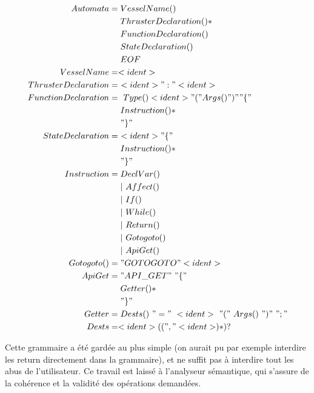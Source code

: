\documentclass[a4paper,11pt]{article}
\begin{document}
        \begin{align}
            Automata &= VesselName()\nonumber\\
                &~~~~ThrusterDeclaration()*\nonumber\\
                &~~~~FunctionDeclaration()~\nonumber\\
                &~~~~StateDeclaration()~\nonumber\\
                &~~~~EOF\nonumber\\
            VesselName &= <ident>\nonumber\\
            ThrusterDeclaration &=  ~<ident> ":" <ident>\nonumber\\
            FunctionDeclaration &=  ~Type() <ident> "(" Args() ")" "\{"\nonumber\\
                &~~~~ Instruction()* \nonumber\\ 
                &~~~~ "\}" \nonumber\\ 
            StateDeclaration &=  ~<ident> "\{"\nonumber\\
                &~~~~ Instruction()* \nonumber\\
                &~~~~ "\}" \nonumber\\
            Instruction &= DeclVar()\nonumber\\
                &~~~~|~Affect()\nonumber\\
                &~~~~|~If() \nonumber\\
                &~~~~|~While() \nonumber\\
                &~~~~|~Return()\nonumber\\
                &~~~~|~Gotogoto() \nonumber\\
                &~~~~|~ApiGet() \nonumber\\
            Gotogoto() &= "GOTOGOTO" <ident>\nonumber\\
            ApiGet&= "API\_GET"~"\{" \nonumber\\
                &~~~~ Getter()*\nonumber\\
                &~~~~ "\}"\nonumber\\
           Getter &=  Dests()~"="~<ident>~"("~Args()~")"~";"\nonumber\\
            Dests &=  <ident> (( "," <ident>)*)?\nonumber\\
        \end{align}

        Cette grammaire a été gardée au plus simple (on aurait pu par exemple interdire les return directement dans la grammaire), et ne suffit pas à interdire tout les abus de l'utilisateur. Ce travail est laissé à l'analyseur sémantique, qui s'assure de la cohérence et la validité des opérations demandées.
        
\end{document}
